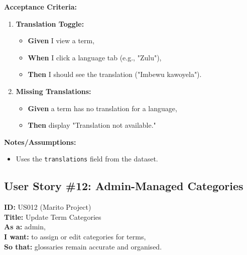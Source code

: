 \documentclass[12pt]{article}
\begin{document}
\vspace{1em}
\textbf{Acceptance Criteria:}
\begin{enumerate}
    \item \textbf{Translation Toggle:}
    \begin{itemize}
        \item \textbf{Given} I view a term,
        \item \textbf{When} I click a language tab (e.g., "Zulu"),
        \item \textbf{Then} I should see the translation ("Imbewu kawoyela").
    \end{itemize}

    \item \textbf{Missing Translations:}
    \begin{itemize}
        \item \textbf{Given} a term has no translation for a language,
        \item \textbf{Then} display "Translation not available."
    \end{itemize}
\end{enumerate}

\vspace{1em}
\textbf{Notes/Assumptions:}
\begin{itemize}
    \item Uses the \texttt{translations} field from the dataset.
\end{itemize}

\subsection{User Story \#12: Admin-Managed Categories}
\textbf{ID:} US012 (Marito Project) \\
\textbf{Title:} Update Term Categories \\
\textbf{As a:} admin, \\
\textbf{I want:} to assign or edit categories for terms, \\
\textbf{So that:} glossaries remain accurate and organised.
\end{document}
